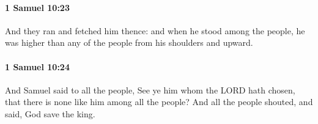 		\paragraph{1 Samuel 10:23} %
			\label{1SAMUEL-10-23}

			And they ran and fetched him thence: and when he stood among the people, he was higher than any of the people from his shoulders and upward.


		\paragraph{1 Samuel 10:24} %
			\label{1SAMUEL-10-24}

			And Samuel said to all the people, See ye him whom the LORD hath chosen, that there is none like him among all the people? And all the people shouted, and said, God save the king.


